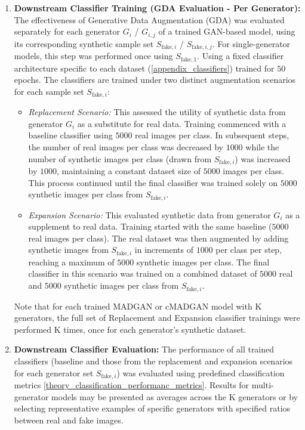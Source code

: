 \begin{enumerate}
    \item \textbf{Downstream Classifier Training (GDA Evaluation - Per Generator):} The effectiveness of Generative Data Augmentation (GDA) was evaluated separately for each generator \(G_i\) / \(G_{i, j}\) of a trained GAN-based model, using its corresponding synthetic sample set \(S_{\text{fake}, i}\) / \(S_{\text{fake}, i, j}\). For single-generator models, this step was performed once using \(S_{\text{fake}, 1}\). Using a fixed classifier architecture specific to each dataset (\ref{appendix_classifiers}) trained for $50$ epochs. The classifiers are trained under two distinct augmentation scenarios for each sample set \(S_{\text{fake}, i}\):
        \begin{itemize} \label{exp_setup_difference_replace_expand}
            \item \textit{Replacement Scenario:} This assessed the utility of synthetic data from generator \(G_i\) as a substitute for real data. Training commenced with a baseline classifier using $5 000$ real images per class. In subsequent steps, the number of real images per class was decreased by $1 000$ while the number of synthetic images per class (drawn from \(S_{\text{fake}, i}\)) was increased by $1 000$, maintaining a constant dataset size of $5 000$ images per class. This process continued until the final classifier was trained solely on $5 000$ synthetic images per class from \(S_{\text{fake}, i}\).
            \item \textit{Expansion Scenario:} This evaluated synthetic data from generator \(G_i\) as a supplement to real data. Training started with the same baseline ($5 000$ real images per class). The real dataset was then augmented by adding synthetic images from \(S_{\text{fake}, i}\) in increments of $1 000$ per class per step, reaching a maximum of $5 000$ synthetic images per class. The final classifier in this scenario was trained on a combined dataset of $5 000$ real and $5 000$ synthetic images per class from \(S_{\text{fake}, i}\).
        \end{itemize}
      Note that for each trained MADGAN or cMADGAN model with K generators, the full set of Replacement and Expansion classifier trainings were performed K times, once for each generator's synthetic dataset.

    \item \textbf{Downstream Classifier Evaluation:} The performance of all trained classifiers (baseline and those from the replacement and expansion scenarios for each generator set \(S_{\text{fake}, i}\)) was evaluated using predefined classification metrics \ref{theory_classification_performanc_metrics}. Results for multi-generator models may be presented as averages across the K generators or by selecting representative examples of specific generators with specified ratios between real and fake images.
\end{enumerate}

